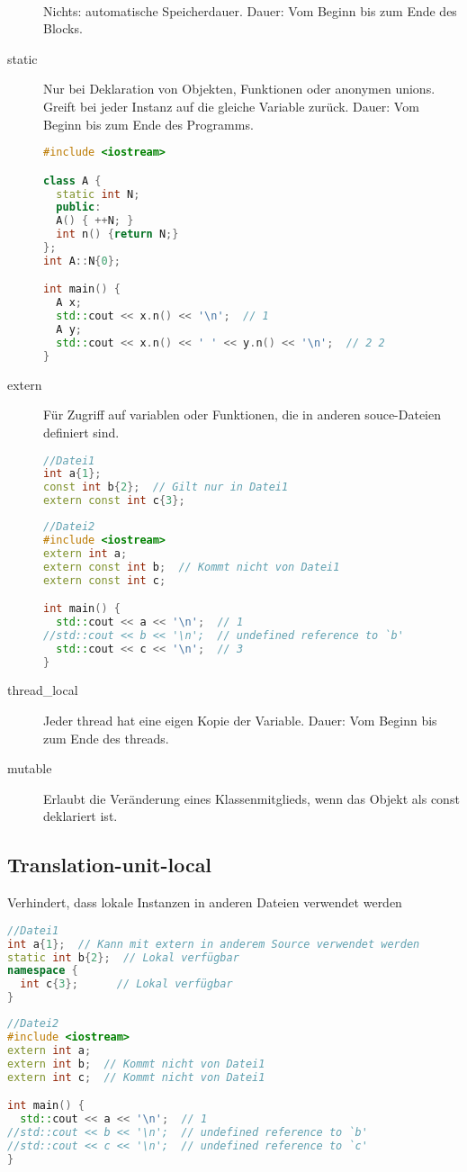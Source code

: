 \documentclass[10pt,twocolumn]{scrartcl}
\begin{document}
\begin{description}
  \item[~] Nichts: automatische Speicherdauer. Dauer: Vom Beginn bis zum Ende des Blocks.
  \item[static] Nur bei Deklaration von Objekten, Funktionen oder anonymen
  unions. Greift bei jeder Instanz auf die gleiche Variable zurück. Dauer: Vom Beginn bis zum Ende des Programms.

\begin{lstlisting}[language=C++]
#include <iostream>

class A {
  static int N;
  public:
  A() { ++N; }
  int n() {return N;}
};
int A::N{0};

int main() {
  A x;
  std::cout << x.n() << '\n';  // 1
  A y;
  std::cout << x.n() << ' ' << y.n() << '\n';  // 2 2
}
\end{lstlisting}

  \item[extern] Für Zugriff auf variablen oder Funktionen, die in anderen souce-Dateien definiert sind.

\begin{lstlisting}[language=C++]
//Datei1
int a{1};
const int b{2};  // Gilt nur in Datei1
extern const int c{3};
\end{lstlisting}
\begin{lstlisting}[language=C++]
//Datei2
#include <iostream>
extern int a;
extern const int b;  // Kommt nicht von Datei1
extern const int c;

int main() {
  std::cout << a << '\n';  // 1
//std::cout << b << '\n';  // undefined reference to `b'
  std::cout << c << '\n';  // 3
}
\end{lstlisting}

  \item[thread\_local] Jeder thread hat eine eigen Kopie der Variable. Dauer: Vom Beginn bis zum Ende des threads.
  \item[mutable] Erlaubt die Veränderung eines Klassenmitglieds, wenn das Objekt als const deklariert ist.
\end{description}

\subsection{Translation-unit-local}

Verhindert, dass lokale Instanzen in anderen Dateien verwendet werden

\begin{lstlisting}[language=C++]
//Datei1
int a{1};  // Kann mit extern in anderem Source verwendet werden
static int b{2};  // Lokal verfügbar
namespace {
  int c{3};      // Lokal verfügbar
}
\end{lstlisting}
\begin{lstlisting}[language=C++]
//Datei2
#include <iostream>
extern int a;
extern int b;  // Kommt nicht von Datei1
extern int c;  // Kommt nicht von Datei1

int main() {
  std::cout << a << '\n';  // 1
//std::cout << b << '\n';  // undefined reference to `b'
//std::cout << c << '\n';  // undefined reference to `c'
}
\end{lstlisting}
\end{document}
